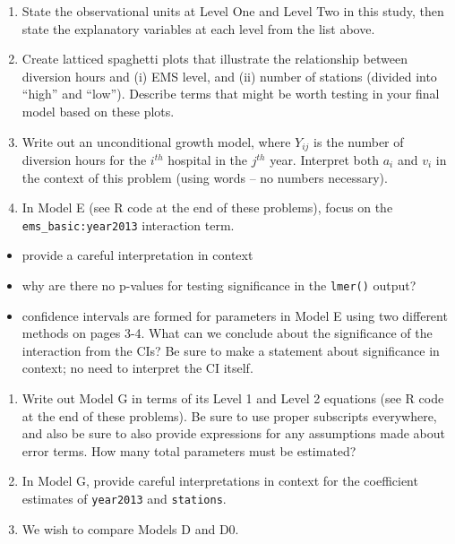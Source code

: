 \documentclass[
]{krantz}
\providecommand{\tightlist}{%
  \setlength{\itemsep}{0pt}\setlength{\parskip}{0pt}}
\begin{document}
\begin{enumerate}
  \begin{enumerate}
  \def\labelenumii{\alph{enumii}.}
  \item
    State the observational units at Level One and Level Two in this study, then state the explanatory variables at each level from the list above.
  \item
    Create latticed spaghetti plots that illustrate the relationship between diversion hours and (i) EMS level, and (ii) number of stations (divided into ``high'' and ``low''). Describe terms that might be worth testing in your final model based on these plots.
  \item
    Write out an unconditional growth model, where \(Y_{ij}\) is the number of diversion hours for the \(i^{th}\) hospital in the \(j^{th}\) year. Interpret both \(a_i\) and \(v_i\) in the context of this problem (using words -- no numbers necessary).
  \item
    In Model E (see R code at the end of these problems), focus on the \texttt{ems\_basic:year2013} interaction term.
  \end{enumerate}

  \begin{itemize}
  \tightlist
  \item
    provide a careful interpretation in context
  \item
    why are there no p-values for testing significance in the \texttt{lmer()} output?
  \item
    confidence intervals are formed for parameters in Model E using two different methods on pages 3-4. What can we conclude about the significance of the interaction from the CIs? Be sure to make a statement about significance in context; no need to interpret the CI itself.
  \end{itemize}

  \begin{enumerate}
  \def\labelenumii{\alph{enumii}.}
  \setcounter{enumii}{4}
  \item
    Write out Model G in terms of its Level 1 and Level 2 equations (see R code at the end of these problems). Be sure to use proper subscripts everywhere, and also be sure to also provide expressions for any assumptions made about error terms. How many total parameters must be estimated?
  \item
    In Model G, provide careful interpretations in context for the coefficient estimates of \texttt{year2013} and \texttt{stations}.
  \item
    We wish to compare Models D and D0.
  \end{enumerate}


\end{enumerate}
\end{document}
